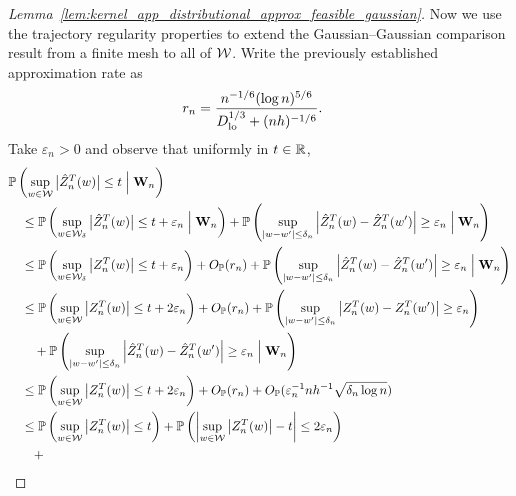 \begin{proof}[%
  Lemma~\ref{lem:kernel_app_distributional_approx_feasible_gaussian}]

  Now we use the trajectory regularity properties to
  extend the Gaussian--Gaussian comparison result from a finite mesh
  to all of $\mathcal{W}$.
  Write the previously established
  approximation rate as
  \begin{align*}
    r_n
    &=
    \frac{n^{-1/6}(\log n)^{5/6}}
    {D_{\textup{lo}}^{1/3} + (n h)^{-1/6}}.
  \end{align*}
  Take $\varepsilon_n > 0$ and observe that
  uniformly in $t \in \mathbb{R}$,
  \begin{align*}
    &\P\left(
      \sup_{w \in \cW}
      \big| \hat Z_n^T(w) \big|
      \leq t
      \Bigm\vert \bW_n
    \right) \\
    &\quad\leq
    \P\left(
      \sup_{w \in \cW_\delta}
      \big| \hat Z_n^T(w) \big|
      \leq t + \varepsilon_n
      \Bigm\vert \bW_n
    \right)
    + \P\left(
      \sup_{|w-w'| \leq \delta_n}
      \left|
      \hat Z_n^T(w)
      - \hat Z_n^T(w')
      \right|
      \geq \varepsilon_n
      \Bigm\vert \bW_n
    \right) \\
    &\quad\leq
    \P\left(
      \sup_{w \in \cW_\delta}
      \big| Z_n^T(w) \big|
      \leq t + \varepsilon_n
    \right)
    + O_\P(r_n)
    + \P\left(
      \sup_{|w-w'| \leq \delta_n}
      \left|
      \hat Z_n^T(w)
      - \hat Z_n^T(w')
      \right|
      \geq \varepsilon_n
      \Bigm\vert \bW_n
    \right) \\
    &\quad\leq
    \P\left(
      \sup_{w \in \cW}
      \big| Z_n^T(w) \big|
      \leq t + 2\varepsilon_n
    \right)
    + O_\P(r_n)
    + \P\left(
      \sup_{|w-w'| \leq \delta_n}
      \left|
      Z_n^T(w)
      - Z_n^T(w')
      \right|
      \geq \varepsilon_n
    \right) \\
    &\qquad+
    \P\left(
      \sup_{|w-w'| \leq \delta_n}
      \left|
      \hat Z_n^T(w)
      - \hat Z_n^T(w')
      \right|
      \geq \varepsilon_n
      \Bigm\vert \bW_n
    \right) \\
    &\quad\leq
    \P\left(
      \sup_{w \in \cW}
      \big| Z_n^T(w) \big|
      \leq t + 2\varepsilon_n
    \right)
    + O_\P(r_n)
    + O_\P(\varepsilon_n^{-1} n h^{-1} \sqrt{\delta_n \log n}) \\
    &\quad\leq
    \P\left(
      \sup_{w \in \cW}
      \big| Z_n^T(w) \big|
      \leq t
    \right)
    + \P\left(
      \left|
      \sup_{w \in \cW}
      \big| Z_n^T(w) \big|
      - t
      \right|
      \leq 2\varepsilon_n
    \right) \\
    &\qquad+

\end{align*}
\end{proof}
